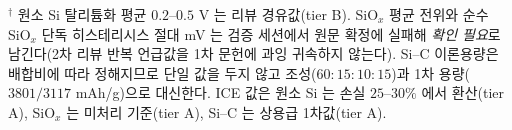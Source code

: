 \begin{warnbox}
$^\dagger$ 원소 Si 탈리튬화 평균 $0.2$--$0.5$ V 는 리뷰 경유값(tier B). SiO$_x$ 평균 전위와 순수
SiO$_x$ 단독 히스테리시스 절대 mV 는 검증 세션에서 원문 확정에 실패해 \emph{확인 필요}로 남긴다(2차
리뷰 반복 언급값을 1차 문헌에 과잉 귀속하지 않는다). Si--C 이론용량은 배합비에 따라 정해지므로 단일
값을 두지 않고 조성($60{:}15{:}10{:}15$)과 1차 용량($3801/3117$ mAh/g)으로 대신한다. ICE 값은 원소
Si 는 손실 $25$--$30\%$ 에서 환산(tier A\cite{limthongkul2003}), SiO$_x$ 는 미처리 기준(tier
A\cite{yom_sio2016}), Si--C 는 상용급 1차값(tier A\cite{andersen_sic2019}).
\end{warnbox}

